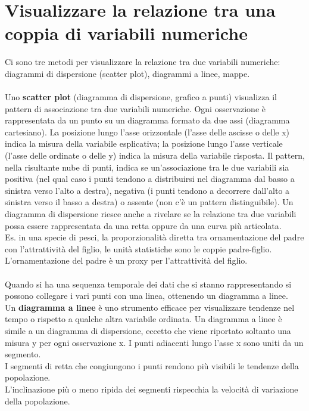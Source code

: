 \documentclass[drafts, 10pt]{book}
\begin{document}
\section{Visualizzare la relazione tra una coppia di variabili numeriche}
Ci sono tre metodi per visualizzare la relazione tra due variabili numeriche: diagrammi di dispersione (scatter plot), diagrammi a linee, mappe.
\\
\\
Uno \textbf{scatter plot} (diagramma di dispersione, grafico a punti) visualizza il pattern di associazione tra due variabili numeriche. Ogni osservazione è rappresentata da un punto su un diagramma formato da due assi (diagramma cartesiano). La posizione lungo l'asse orizzontale (l'asse delle ascisse o delle x) indica la misura della variabile esplicativa; la posizione lungo l'asse verticale (l'asse delle ordinate o delle y) indica la misura della variabile risposta. Il pattern, nella risultante nube di punti, indica se un'associazione tra le due variabili sia positiva (nel qual caso i punti tendono a distribuirsi nel diagramma dal basso a sinistra verso l'alto a destra), negativa (i punti tendono a decorrere dall'alto a sinistra verso il basso a destra) o assente (non c'è un pattern distinguibile). Un diagramma di dispersione riesce anche a rivelare se la relazione tra due variabili possa essere rappresentata da una retta oppure da una curva più articolata.
\\
Es. in una specie di pesci, la proporzionalità diretta tra ornamentazione del padre con l’attrattività del figlio, le unità statistiche sono le coppie padre-figlio. L’ornamentazione del padre è un proxy per l’attrattività del figlio.
\\
\\
Quando si ha una sequenza temporale dei dati che si stanno rappresentando si possono collegare i vari punti con una linea, ottenendo un diagramma a linee.
\\
Un \textbf{diagramma a linee} è uno strumento efficace per visualizzare tendenze nel tempo o rispetto a qualche altra variabile ordinata. Un diagramma a linee è simile a un diagramma di dispersione, eccetto che viene riportato soltanto una misura y per ogni osservazione x. I punti adiacenti lungo l'asse x sono uniti da un segmento.
\\
I segmenti di retta che congiungono i punti rendono più visibili le tendenze della popolazione. 
\\
L'inclinazione più o meno ripida dei segmenti rispecchia la velocità di variazione della popolazione.
\end{document}
